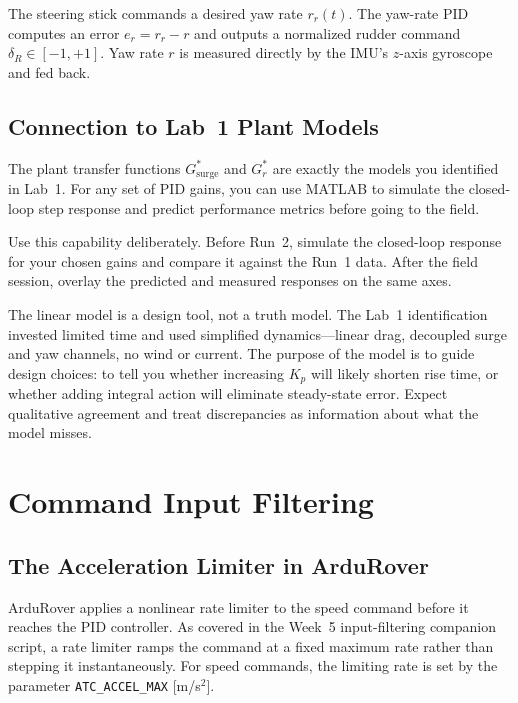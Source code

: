 \documentclass[../../book.tex]{subfiles}
\begin{document}
The steering stick commands a desired yaw rate $r_r(t)$.  The yaw-rate PID computes an error $e_r = r_r - r$ and outputs a normalized rudder command $\delta_R \in [-1, +1]$.  Yaw rate $r$ is measured directly by the IMU's $z$-axis gyroscope and fed back.

\subsection{Connection to Lab~1 Plant Models}

The plant transfer functions $G_{\mathrm{surge}}^*$ and $G_r^*$ are exactly the models you identified in Lab~1.  For any set of PID gains, you can use MATLAB to simulate the closed-loop step response and predict performance metrics before going to the field.

Use this capability deliberately.  Before Run~2, simulate the closed-loop response for your chosen gains and compare it against the Run~1 data.  After the field session, overlay the predicted and measured responses on the same axes.

The linear model is a design tool, not a truth model.  The Lab~1 identification invested limited time and used simplified dynamics---linear drag, decoupled surge and yaw channels, no wind or current.  The purpose of the model is to guide design choices: to tell you whether increasing $K_p$ will likely shorten rise time, or whether adding integral action will eliminate steady-state error.  Expect qualitative agreement and treat discrepancies as information about what the model misses.

\section{Command Input Filtering}
\label{sec:filtering}

\subsection{The Acceleration Limiter in ArduRover}

ArduRover applies a nonlinear rate limiter to the speed command before it reaches the PID controller.  As covered in the Week~5 input-filtering companion script, a rate limiter ramps the command at a fixed maximum rate rather than stepping it instantaneously.  For speed commands, the limiting rate is set by the parameter \texttt{ATC\_ACCEL\_MAX} [m/s$^2$].
\end{document}
